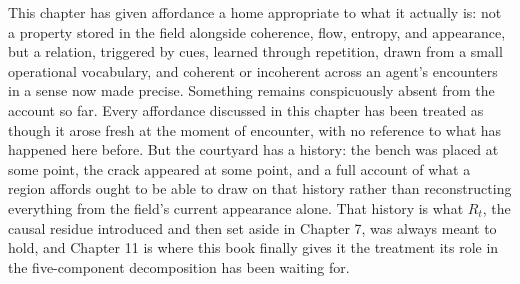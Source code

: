 This chapter has given affordance a home appropriate to what it actually is: not a property stored in the field alongside coherence, flow, entropy, and appearance, but a relation, triggered by cues, learned through repetition, drawn from a small operational vocabulary, and coherent or incoherent across an agent's encounters in a sense now made precise. Something remains conspicuously absent from the account so far. Every affordance discussed in this chapter has been treated as though it arose fresh at the moment of encounter, with no reference to what has happened here before. But the courtyard has a history: the bench was placed at some point, the crack appeared at some point, and a full account of what a region affords ought to be able to draw on that history rather than reconstructing everything from the field's current appearance alone. That history is what \(R_t\), the causal residue introduced and then set aside in Chapter 7, was always meant to hold, and Chapter 11 is where this book finally gives it the treatment its role in the five-component decomposition has been waiting for.
